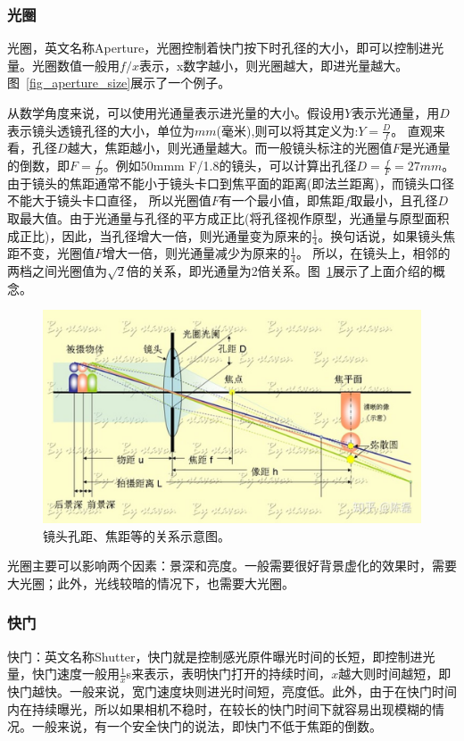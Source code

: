 \documentclass{ctexart}
\begin{document}
\subsubsection{光圈}
光圈，英文名称Aperture，光圈控制着快门按下时孔径的大小，即可以控制进光量。光圈数值一般用${f/x}$表示，x数字越小，则光圈越大，即进光量越大。图~\ref{fig_aperture_size}展示了一个例子。

从数学角度来说，可以使用光通量表示进光量的大小。假设用$Y$表示光通量，用$D$表示镜头透镜孔径的大小，单位为$mm$(毫米),则可以将其定义为:$Y=\frac{D}{f}$。
直观来看，孔径$D$越大，焦距越小，则光通量越大。而一般镜头标注的光圈值$F$是光通量的倒数，即$F=\frac{f}{D}$。例如50mmm F/1.8的镜头，可以计算出孔径$D=\frac{f}{F}=27mm$。
由于镜头的焦距通常不能小于镜头卡口到焦平面的距离(即法兰距离)，而镜头口径不能大于镜头卡口直径， 所以光圈值$F$有一个最小值，即焦距$f$取最小，且孔径$D$取最大值。由于光通量与孔径的平方成正比(将孔径视作原型，光通量与原型面积成正比)，因此，当孔径增大一倍，则光通量变为原来的$\frac{1}{4}$。换句话说，如果镜头焦距不变，光圈值$F$增大一倍，则光通量减少为原来的$\frac{1}{4}$。
所以，在镜头上，相邻的两档之间光圈值为$\sqrt{2}$倍的关系，即光通量为2倍关系。图~\ref{fig_aperture_math}展示了上面介绍的概念。
\begin{figure}[h!]
    \centering
    \label{fig_aperture_math}
    \includegraphics[width=.8\linewidth]{imgs/aperture_math.jpg}
    \caption{镜头孔距、焦距等的关系示意图。}
\end{figure}

光圈主要可以影响两个因素：景深和亮度。一般需要很好背景虚化的效果时，需要大光圈；此外，光线较暗的情况下，也需要大光圈。

\subsubsection{快门}
快门：英文名称Shutter，快门就是控制感光原件曝光时间的长短，即控制进光量，快门速度一般用$\frac{1}{x}$s来表示，表明快门打开的持续时间，$x$越大则时间越短，即快门越快。一般来说，宽门速度块则进光时间短，亮度低。此外，由于在快门时间内在持续曝光，所以如果相机不稳时，在较长的快门时间下就容易出现模糊的情况。一般来说，有一个安全快门的说法，即快门不低于焦距的倒数。
\end{document}
